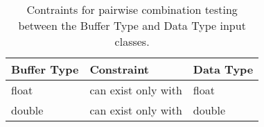\begin{table}[ht]

\scriptsize
\centering
\caption{Contraints for pairwise combination testing between the Buffer Type and Data Type input classes.}
\label{table:constraints_3_DAMA}

\begin{tabular}{@{}lll@{}}
  \toprule
\textbf{Buffer   Type} & \textbf{Constraint} & \textbf{Data Type} \\ \midrule
float                  & can exist only with     & float              \\
double                 & can exist only with     & double             \\ \bottomrule
\end{tabular}

\end{table}
